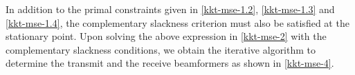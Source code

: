 In addition to the primal constraints given in \eqref{kkt-mse-1.2}, \eqref{kkt-mse-1.3} and \eqref{kkt-mse-1.4}, the complementary slackness criterion must also be satisfied at the stationary point. Upon solving the above expression in \eqref{kkt-mse-2} with the complementary slackness conditions, we obtain the iterative algorithm to determine the transmit and the receive beamformers as shown in \eqref{kkt-mse-4}.
